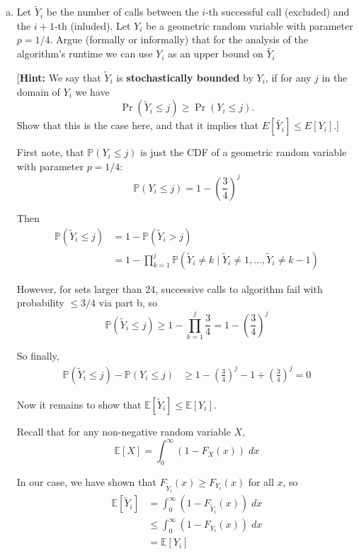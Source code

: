 \documentclass[12pt,letterpaper]{article}
\renewcommand{\P}{\mathbb{P}}
\newcommand{\E}{\mathbb{E}}
\begin{document}
\begin{enumerate}[a.]
   Since $n \geq 24$, 
   \[\P(\text{success}) \geq \frac{1}{3} - \frac{1}{72} = \frac{23}{72} > \frac{1}{4}\]
   
    

   
\color{black}

\item 
Let $\tilde{Y}_i$ be the number of calls  between the $i$-th successful call (excluded) and the $i+1$-th (inluded). 
Let $Y_i$ be a geometric random variable with parameter $p=1/4$. 
Argue (formally or informally) that for the analysis of the algorithm's runtime we can use $Y_i$ as an upper bound on $\tilde{Y_i}$

[{\bf Hint:} We say that $\tilde{Y}_i$ is \textbf{stochastically bounded} by $Y_i$,
if for any $j$ in the domain of $Y_i$ we have
$$\Pr(\tilde{Y}_i \leq j) \geq \Pr(Y_i \leq j).$$  Show that this is the case here, and that it implies that $E[\tilde{Y_i}]\leq E[Y_i]$.]

\color{darkblue}
    First note, that $\P(Y_i \leq j)$ is just the CDF of a geometric random variable with parameter $p=1/4$:
    \[\P(Y_i \leq j) = 1 - \left(\frac{3}{4}\right)^{j} \]
    
    Then 
    \begin{align*}
        \P(\tilde Y_i \leq j) &= 1 - \P(\tilde Y_i > j)\\
        &= 1 - \prod_{k=1}^j \P(\tilde Y_i \neq k \; | \; \tilde Y_i \neq 1, \dots, \tilde Y_i \neq k-1)
    \end{align*}

    However, for sets larger than 24, successive calls to algorithm fail with probability $\leq 3/4$ via part b, so
    \[ \P(\tilde Y_i \leq j) \geq 1 - \prod_{k=1}^j \frac{3}{4} = 1 - \left(\frac{3}{4}\right)^{j} \] 

    So finally,  
    \begin{align*}
        \P(\tilde Y_i \leq j) - \P(Y_i \leq j)  &\geq 1 - \left(\frac{3}{4}\right)^{j} - 1 + \left(\frac{3}{4}\right)^{j} = 0
    \end{align*}
    
    Now it remains to show that $\E[\tilde Y_i] \leq \E[Y_i]$. 

    Recall that for any non-negative random variable $X$,
    \[\E[X] = \int_0^{\infty} (1 - F_X(x)) \; dx\]

    In our case, we have shown that $F_{\tilde Y_i}(x) \geq F_{Y_i}(x)$ for all $x$, so
    \begin{align*}
        \E[\tilde Y_i] &= \int_0^{\infty} (1 - F_{\tilde Y_i}(x)) \; dx\\
        &\leq \int_0^{\infty} (1 - F_{Y_i}(x)) \; dx\\
        &= \E[Y_i]
    \end{align*}



\end{enumerate}
\end{document}
